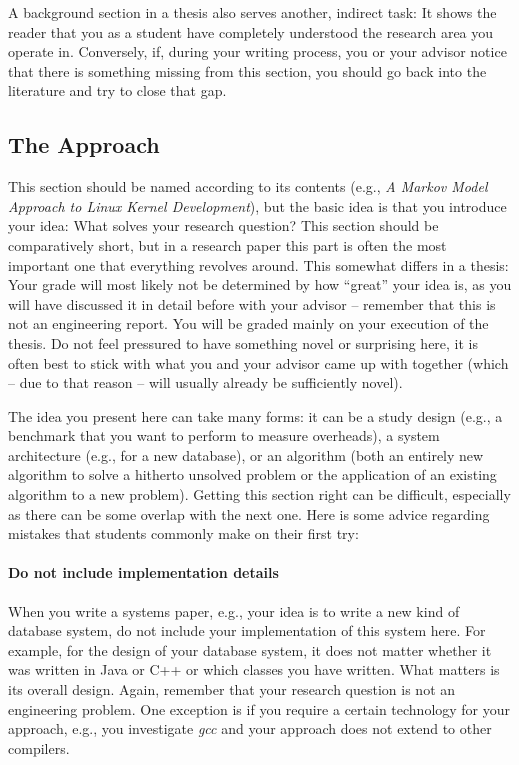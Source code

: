\documentclass[a4]{article}
\begin{document}
A background section in a thesis also serves another, indirect task:
It shows the reader that you as a student have completely understood the research area you operate in.
Conversely, if, during your writing process, you or your advisor notice that there is something missing from this section, you should go back into the literature and try to close that gap.

\subsection{The Approach}

This section should be named according to its contents (e.g., \emph{A Markov Model Approach to Linux Kernel Development}), but the basic idea is that you introduce your idea: What solves your research question?
This section should be comparatively short, but in a research paper this part is often the most important one that everything revolves around.
This somewhat differs in a thesis: Your grade will most likely not be determined by how ``great'' your idea is, as you will have discussed it in detail before with your advisor -- remember that this is not an engineering report.
You will be graded mainly on your execution of the thesis.
Do not feel pressured to have something novel or surprising here, it is often best to stick with what you and your advisor came up with together (which -- due to that reason -- will usually already be sufficiently novel).

The idea you present here can take many forms: it can be a study design (e.g., a benchmark that you want to perform to measure overheads), a system architecture (e.g., for a new database), or an algorithm (both an entirely new algorithm to solve a hitherto unsolved problem or the application of an existing algorithm to a new problem).
Getting this section right can be difficult, especially as there can be some overlap with the next one.
Here is some advice regarding mistakes that students commonly make on their first try:

\paragraph{Do not include implementation details}
When you write a systems paper, e.g., your idea is to write a new kind of database system, do not include your implementation of this system here.
For example, for the design of your database system, it does not matter whether it was written in Java or C++ or which classes you have written.
What matters is its overall design.
Again, remember that your research question is not an engineering problem.
One exception is if you require a certain technology for your approach, e.g., you investigate \emph{gcc} and your approach does not extend to other compilers.
\end{document}

